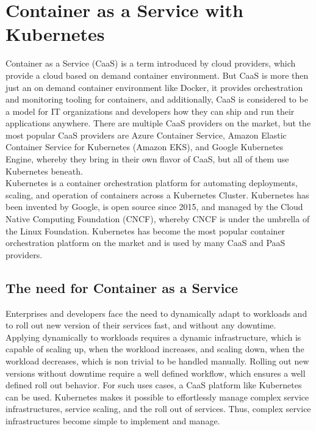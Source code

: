 \chapter{Container as a Service with Kubernetes}
\label{cha:caas}
Container as a Service (CaaS) is a term introduced by cloud providers, which provide a cloud based on demand container environment. But CaaS is more then just an on demand container environment like Docker, it provides orchestration and monitoring tooling for containers, and additionally, CaaS is considered to be a model for IT organizations and developers how they can ship and run their applications anywhere. There are multiple CaaS providers on the market, but the most popular CaaS providers are Azure Container Service, Amazon Elastic Container Service for Kubernetes (Amazon EKS), and Google Kubernetes Engine, whereby they bring in their own flavor of CaaS, but all of them use Kubernetes beneath\cite{CNCFKubernetes2018, MicrosoftAzureAKS2018, AmazonWebServicesEKS2018, GoogleCloudKE2018}. \\

Kubernetes is a container orchestration platform for automating deployments, scaling, and operation of containers across a Kubernetes Cluster. Kubernetes has been invented by Google, is open source since 2015, and managed by the Cloud Native Computing Foundation (CNCF), whereby CNCF is under the umbrella of the Linux Foundation. Kubernetes has become the most popular container orchestration platform on the market and is used by many CaaS and PaaS providers\cite{CNCF2018}.

\section{The need for Container as a Service}
\label{sec:caas-need-for-caas}
Enterprises and developers face the need to dynamically adapt to workloads and to roll out new version of their services fast, and without any downtime. Applying dynamically to workloads requires a dynamic infrastructure, which is capable of scaling up, when the workload increases, and scaling down, when the workload decreases, which is non trivial to be handled manually. Rolling out new versions without downtime require a well defined workflow, which ensures a well defined roll out behavior. For such uses cases, a CaaS platform like Kubernetes can be used. Kubernetes makes it possible to effortlessly manage complex service infrastructures, service scaling, and the roll out of services. Thus, complex service infrastructures become simple to implement and manage. \\

